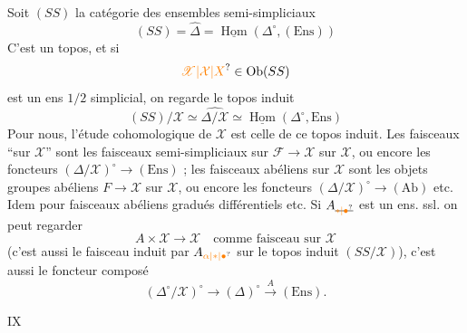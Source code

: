 Soit $(SS)$ la catégorie des ensembles semi-simpliciaux
\[
 (SS)=\widehat{\mathbb{\Delta}}=\underline{\operatorname{Hom}}(\mathbb{\Delta}^{\circ},(\mathrm{Ens}))
\]
C'est un topos, et si
\[
 \unsure{\mathscr{X}|\mathcal{X}|X}\in\operatorname{Ob}(SS)
\]
est un ens $1/2$ simplicial, on regarde le topos induit
\[
 (SS)/\mathscr{X}\simeq\widehat{\mathbb{\Delta}/\mathscr{X}}\simeq
 \underline{\operatorname{Hom}}(\mathbb{\Delta}^\circ,\mathrm{Ens})
\]
Pour nous, l'étude cohomologique de $\mathscr{X}$ est celle de ce topos induit. Les faisceaux  ``sur $\mathscr{X}$'' sont les  faisceaux semi-simpliciaux sur $\mathscr{F}\to\mathscr{X}$ sur $\mathscr{X}$, ou encore les foncteurs $(\mathbb{\Delta}/\mathscr{X})^\circ\to(\mathrm{Ens})$ ; les faisceaux abéliens sur $\mathscr{X}$ sont les objets groupes abéliens $F\to\mathscr{X}$ sur $\mathscr{X}$, ou encore les foncteurs $(\mathbb{\Delta}/\mathscr{X})^\circ\to(\mathrm{Ab})$ etc. Idem pour faisceaux abéliens gradués différentiels etc. Si $A_{\deleted{\unsure{*|\bullet}}}$ est un ens. ssl. on peut regarder
\[
 A\times\mathscr{X}\longrightarrow\mathscr{X}\quad\text{comme faisceau sur }\mathscr{X}
\]
(c'est aussi le faisceau induit par $A_{\unsure{\alpha|*|\bullet}}$ sur le topos induit $(SS/\mathscr{X})$), c'est aussi le foncteur composé
\[
 (\mathbb{\Delta}^{\circ}/\mathscr{X})^\circ\longrightarrow
 (\mathbb{\Delta})^\circ\xrightarrow{A}(\mathrm{Ens}).
\]

\hfill IX

